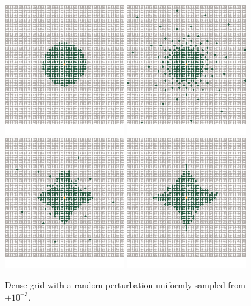 \documentclass[review,supplement,onefignum,onetabnum]{siamonline220329}
\begin{document}
\begin{figure}[H]
  \centering
  \includegraphics{figures/precompiled/grid_1e-3/points_1.pdf}%
  \quad
  \includegraphics{figures/precompiled/grid_1e-3/points_2.pdf}%
  \quad
  \includegraphics{figures/precompiled/grid_1e-3/points_3.pdf}%
  \quad
  \includegraphics{figures/precompiled/grid_1e-3/points_4.pdf}%
  \caption{
    Dense grid with a random perturbation
    uniformly sampled from \( \pm 10^{-3} \).
  }
\end{figure}
\end{document}
